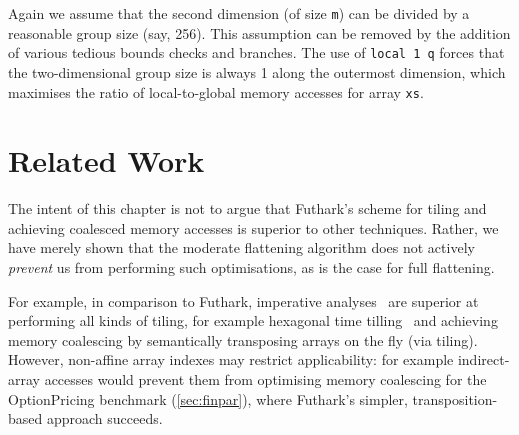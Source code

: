 Again we assume that the second dimension (of size \texttt{m}) can be
divided by a reasonable group size (say, 256).  This assumption can be
removed by the addition of various tedious bounds checks and branches.
The use of \lstinline{local 1 q} forces that the two-dimensional group
size is always 1 along the outermost dimension, which maximises the
ratio of local-to-global memory accesses for array \lstinline{xs}.

\section{Related Work}

The intent of this chapter is not to argue that Futhark's scheme for
tiling and achieving coalesced memory accesses is superior to other
techniques.  Rather, we have merely shown that the moderate flattening
algorithm does not actively \textit{prevent} us from performing such
optimisations, as is the case for full flattening.

For example, in comparison to Futhark, imperative
analyses~\cite{InformalTiling,PolyPluto2} are superior at performing
all kinds of tiling, for example hexagonal time
tilling~\cite{HexaTiling} and achieving memory coalescing by
semantically transposing arrays on the fly (via tiling).
%
However, non-affine array indexes may restrict applicability: for
example indirect-array accesses would prevent them from optimising
memory coalescing for the OptionPricing benchmark (\cref{sec:finpar}),
where Futhark's simpler, transposition-based approach succeeds.

